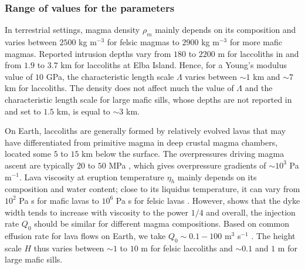 \subsubsection*{Range of values for the parameters}
\label{sec:range-valu-param}

In terrestrial settings, magma density  $\rho_m$ mainly depends on its
composition and varies  between $ 2500$ kg m$^{-3}$  for felsic magmas
to  $2900$ kg  m$^{-3}$  for more  mafic  magmas.  Reported  intrusion
depths vary from $180$ to  $2200$ m for laccoliths in \citet{E:2015tl}
and from $1.9$ to $3.7$ km  for laccoliths at Elba Island.  Hence, for
a Young's modulus  value of $10$ GPa, the  characteristic length scale
$\Lambda$ varies between  $\sim 1$ km and $\sim 7$  km for laccoliths.
The  density does  not  affect much  the value  of  $\Lambda$ and  the
characteristic length  scale for large  mafic sills, whose  depths are
not reported  in \citet{Cruden:tg} and  set to  $1.5$ km, is  equal to
$\sim 3$ km.

On Earth, laccoliths are generally  formed by relatively evolved lavas
that  may have  differentiated from  primitive magma  in deep  crustal
magma chambers,  located some $5$  to $15$  km below the  surface. The
overpressures  driving magma  ascent are  typically $20$  to $50$  MPa
\citep{Stasiuk:1993kg,Barmin:2002ea},    which   gives    overpressure
gradients  of $\sim  10^3$ Pa  m$^{-1}$.  Lava  viscosity at  eruption
temperature  $\eta_h$  mainly depends  on  its  composition and  water
content; close to its liquidus temperature, it can vary from $10^2$ Pa
s   for   mafic   lavas   to   $10^{6}$  Pa   s   for   felsic   lavas
\citep{Anonymous:CZVBrBvv,Giordano:2008em,Whittington:2009fv,Chevrel:2013jn}. However,
\citet{Wada:2007tv} shows that  the dyke width tends  to increase with
viscosity  to the  power  $1/4$ \citep{Kerr:1995tl}  and overall,  the
injection   rate  $Q_0$   should  be   similar  for   different  magma
compositions.  Based on common effusion  rate for lava flows on Earth,
we       take       $Q_0\sim       0.1-100$       m$^3$       s$^{-1}$
\citep{Pieri:1986bf,Harris:2000jd,Castro:2013jo,Tuffen:2013di}.    The
height scale  $H$ thus varies  between $\sim 1$  to $10$ m  for felsic
laccoliths and $\sim0.1$ and $1$ m for large mafic sills.

